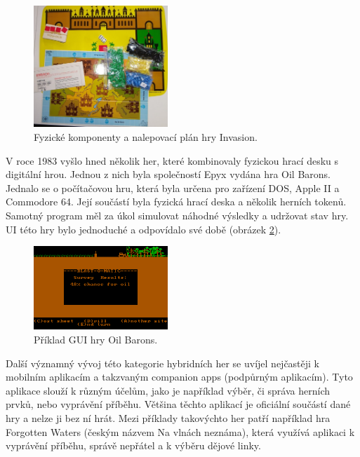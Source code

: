 \begin{figure}[H]
    \centering
    \includegraphics[width=0.45\textwidth]{resources/figures/invasion.jpg}
    \caption{Fyzické komponenty a nalepovací plán hry Invasion.\cite{invasion}}
    \label{fig:invasion}
\end{figure}

V roce 1983 vyšlo hned několik her, které kombinovaly fyzickou hrací desku s digitální hrou. Jednou z nich byla společností Epyx vydána hra Oil Barons. Jednalo se o počítačovou hru, která byla určena pro zařízení DOS, Apple II a Commodore 64. Její součástí byla fyzická hrací deska a několik herních tokenů. Samotný program měl za úkol simulovat náhodné výsledky a udržovat stav hry. UI této hry bylo jednoduché a odpovídalo své době (obrázek \ref{fig:oil_barons}).\cite{oil_barons}

\begin{figure}[H]
    \centering
    \includegraphics[width=0.45\textwidth]{resources/figures/oil_barons.png}
    \caption{Příklad GUI hry Oil Barons.\cite{oil_barons}}
    \label{fig:oil_barons}
\end{figure}

Další významný vývoj této kategorie hybridních her se uvíjel nejčastěji k mobilním aplikacím a takzvaným companion apps (podpůrným aplikacím). Tyto aplikace slouží k různým účelům, jako je například výběr, či správa herních prvků, nebo vyprávění příběhu. Většina těchto aplikací je oficiální součástí dané hry a nelze ji bez ní hrát. Mezi příklady takovýchto her patří například hra Forgotten Waters (českým názvem Na vlnách neznáma), která využívá aplikaci k vyprávění příběhu, správě nepřátel a k výběru dějové linky.

